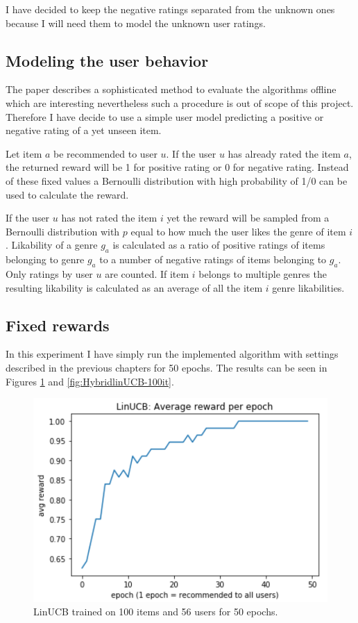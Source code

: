 \documentclass[12pt, titlepage]{article}
\begin{document}
I have decided to keep the negative ratings separated from the unknown ones because I will need them to model the unknown user ratings.

\subsection{Modeling the user behavior}
The paper describes a sophisticated method to evaluate the algorithms offline which are interesting nevertheless such a procedure is out of scope of this project. Therefore I have decide to use a simple user model predicting a positive or negative rating of a yet unseen item.

Let item $a$ be recommended to user $u$.
If the user $u$ has already rated the item $a$, the returned reward will be 1 for positive rating or 0 for negative rating. Instead of these fixed values a Bernoulli distribution with high probability of 1/0 can be used to calculate the reward.

If the user $u$ has not rated the item $i$  yet the reward will be sampled from a Bernoulli distribution with $p$ equal to how much the user likes the genre of item $i$. Likability of a genre $g_a$ is calculated as a ratio of positive ratings of items belonging to genre $g_a$ to a number of negative ratings of items belonging to $g_a$. Only ratings by user $u$ are counted. If item $i$ belongs to multiple genres the resulting likability is calculated as an average of all the item $i$ genre likabilities.

\subsection{Fixed rewards}
In this experiment I have simply run the implemented algorithm with settings described in the previous chapters for 50 epochs. The results can be seen in Figures \ref{fig:linUCB-100it} and \ref{fig:HybridlinUCB-100it}. 


\begin{figure}[h!]
 \centering
 \includegraphics[scale=0.5]{img/LinUCB-100items-50epochs}
 \caption{LinUCB trained on 100 items and 56 users for 50 epochs.}
 \label{fig:linUCB-100it}
\end{figure}
\end{document}
